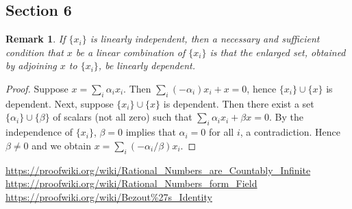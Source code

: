\documentclass{article}
\theoremstyle{thmstyleone}
\theoremstyle{thmstyletwo}
\newtheorem{remark}[theorem]{Remark}
\theoremstyle{thmstylethree}
\begin{document}
\subsection{Section 6}
\begin{remark}
If $\{x_i\}$ is linearly independent, then a necessary and sufficient condition that $x$ be a linear combination of $\{x_i\}$ is that the enlarged set, obtained by adjoining $x$ to $\{x_i\}$, be linearly dependent.
\end{remark}
\begin{proof}
Suppose $x = \sum_i\alpha_i x_i$.
Then $\sum_i(-\alpha_i) x_i + x = 0$, hence $\{x_i\}\cup \{x\}$ is dependent.
Next, suppose $\{x_i\}\cup \{x\}$ is dependent.
Then there exist a set $\{\alpha_i\}\cup\{\beta\}$ of scalars (not all zero) such that $\sum_i\alpha_i x_i + \beta x = 0$.
By the independence of $\{x_i\}$, $\beta = 0$ implies that $\alpha_i = 0$ for all $i$, a contradiction.
Hence $\beta \ne 0$ and we obtain $x = \sum_i (-\alpha_i/\beta)x_i$.
\end{proof}

\begin{thebibliography}{9}
 \url{https://proofwiki.org/wiki/Rational_Numbers_are_Countably_Infinite}
 \url{https://proofwiki.org/wiki/Rational_Numbers_form_Field}
 \url{https://proofwiki.org/wiki/Bezout\%27s_Identity}
\end{thebibliography}
\end{document}
